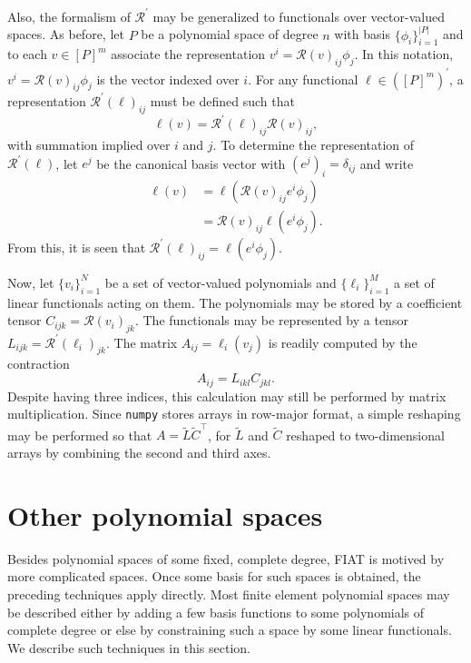 Also, the formalism of \( \mathcal{R}^\prime \) may be generalized
to functionals over vector-valued spaces.  As before, let \( P \)
be a polynomial space of degree \( n \) with basis \( \{ \phi_i \}_{i=1}^{|P|}
\) and to each \( v \in [P]^m \) associate the representation \(
v^i = \mathcal{R}(v)_{ij}\phi_j \).  In this notation, \( v^i =
\mathcal{R}(v)_{ij} \phi_j \) is the vector indexed over \( i \).
For any functional \( \ell \in \left( [P]^m \right)^\prime
\), a representation \( \mathcal{R}^\prime(\ell)_{ij} \) must be defined
such that
\[
\ell(v) = \mathcal{R}^\prime(\ell)_{ij} \mathcal{R}(v)_{ij},
\]
with summation implied over \(i\) and \( j\).  To determine the
representation of \( \mathcal{R}^\prime(\ell) \), let \( e^j \) be the
canonical basis vector with \( (e^j)_i = \delta_{ij} \) and write
\begin{equation} \label{eq:strange}
\begin{split}
\ell(v)
& = \ell( \mathcal{R}(v)_{ij} e^i \phi_j ) \\
& = \mathcal{R}(v)_{ij} \ell( e^i \phi_j ).
\end{split}
\end{equation}
From this, it is seen that \( \mathcal{R}^\prime(\ell)_{ij} = \ell(
e^i \phi_j ) \).

Now, let \( \{ v_i \}_{i=1}^N \) be a set of vector-valued polynomials
and \( \{ \ell_i \}_{i=1}^M \) a set of linear functionals acting on
them.  The polynomials may be stored by a coefficient tensor \( C_{ijk}
= \mathcal{R}(v_i)_{jk} \).  The functionals may be represented by a
tensor \( L_{ijk} = \mathcal{R}^\prime(\ell_i)_{jk} \).  The matrix \(
A_{ij} = \ell_i(v_j) \) is readily computed by the contraction
\[
A_{ij} = L_{ikl} C_{jkl}.
\]
Despite having three indices, this calculation may still be performed by
matrix multiplication.  Since \texttt{numpy} stores arrays in row-major
format, a simple reshaping may be performed so that
\( A = \tilde{L} \tilde{C}^{\top} \), for \( \tilde{L} \) and \( \tilde{C} \)
reshaped to two-dimensional arrays by combining the second and third axes.

\section{Other polynomial spaces}

Besides polynomial spaces of some fixed, complete degree, FIAT is motived
by more complicated spaces.  Once some basis for such spaces is obtained,
the preceding techniques apply directly.  Most finite element polynomial
spaces may be described either by adding a few basis functions to some
polynomials of complete degree or else by constraining such a space by
some linear functionals.  We describe such techniques in this section.

